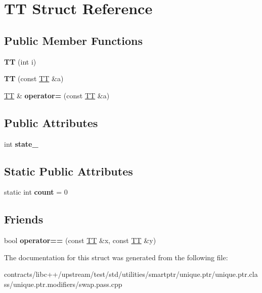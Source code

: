 \hypertarget{struct_t_t}{}\section{TT Struct Reference}
\label{struct_t_t}
\subsection*{Public Member Functions}
\begin{DoxyCompactItemize}
\item 
\mbox{\label{struct_t_t_ac171d18355e9ab7995b628f2de917f2a}} 
{\bfseries TT} (int i)
\item 
\mbox{\label{struct_t_t_a54d2632676a9f2be543e10a25b2b2ca8}} 
{\bfseries TT} (const \mbox{\hyperlink{struct_t_t}{TT}} \&a)
\item 
\mbox{\label{struct_t_t_a2e1289dcdfb91fc3eb4715e6f15c07e5}} 
\mbox{\hyperlink{struct_t_t}{TT}} \& {\bfseries operator=} (const \mbox{\hyperlink{struct_t_t}{TT}} \&a)
\end{DoxyCompactItemize}
\subsection*{Public Attributes}
\begin{DoxyCompactItemize}
\item 
\mbox{\label{struct_t_t_a6d102f07d67e81d3d8a5f28e7483aa07}} 
int {\bfseries state\+\_\+}
\end{DoxyCompactItemize}
\subsection*{Static Public Attributes}
\begin{DoxyCompactItemize}
\item 
\mbox{\label{struct_t_t_a32db99510e0540247c463d5c0de0b0b3}} 
static int {\bfseries count} = 0
\end{DoxyCompactItemize}
\subsection*{Friends}
\begin{DoxyCompactItemize}
\item 
\mbox{\label{struct_t_t_a3f6ce6da84d3c7b3266b14d0c43a7964}} 
bool {\bfseries operator==} (const \mbox{\hyperlink{struct_t_t}{TT}} \&x, const \mbox{\hyperlink{struct_t_t}{TT}} \&y)
\end{DoxyCompactItemize}


The documentation for this struct was generated from the following file\+:\begin{DoxyCompactItemize}
\item 
contracts/libc++/upstream/test/std/utilities/smartptr/unique.\+ptr/unique.\+ptr.\+class/unique.\+ptr.\+modifiers/swap.\+pass.\+cpp\end{DoxyCompactItemize}
